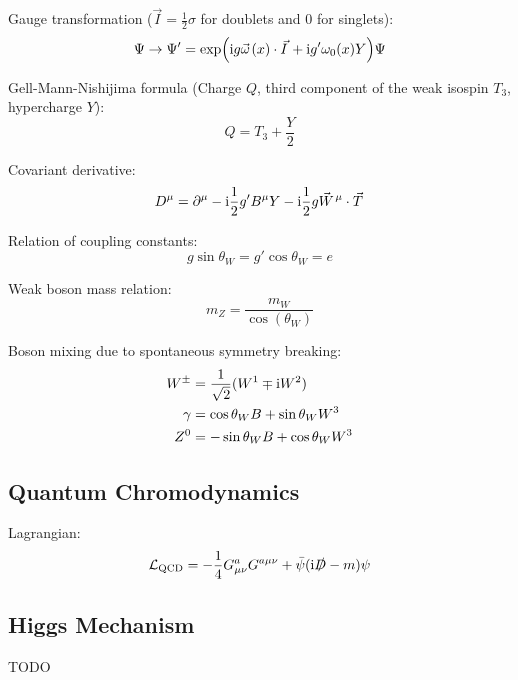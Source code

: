 		\noindent
		Gauge transformation ($\vec{I}=\frac{1}{2}\sigma$ for doublets and $0$ for singlets):
		\begin{equation}
			\Psi \rightarrow \Psi' = \exp(\i g \vec{\omega}(x)\cdot\vec{I}	+ \i g' \omega_0(x) Y) \Psi
		\end{equation}

		\noindent
		Gell-Mann-Nishijima formula (Charge $Q$, third component of the weak isospin $T_3$, hypercharge $Y$):
		\begin{equation}
			Q = T_3 + \frac{Y}{2}
		\end{equation}

		\noindent
		Covariant derivative:
		\begin{equation}
			D^\mu = \partial^\mu - \i \frac{1}{2} g' B^\mu Y - \i \frac{1}{2} g \vec{W}^\mu \cdot \vec{T}
		\end{equation}
		
		\noindent
		Relation of coupling constants:
		\begin{equation}
			g \sin\theta_W = g' \cos\theta_W = e
		\end{equation}

		\noindent
		Weak boson mass relation:
		\begin{equation}
			m_Z = \frac{m_W}{\cos(\theta_W)}
		\end{equation}
		
		\noindent
		Boson mixing due to spontaneous symmetry breaking:
		\begin{equation}
			\begin{aligned}
				W^\pm &= \frac{1}{\sqrt{2}}(W^1 \mp \mathrm{i} W^2) \\
				\gamma &= \cos\theta_W B + \sin\theta_W W^3 \\
				Z^0 &= -\sin\theta_W B + \cos\theta_W W^3
			\end{aligned}
		\end{equation}


	\subsection{Quantum Chromodynamics} 
		Lagrangian:
		\begin{equation}
			\mathcal{L}_\text{QCD} = -\frac{1}{4} G^a_{\mu\nu} G^{a\mu\nu} + \bar{\psi}(\mathrm{i}\slashed{D}-m)\psi
		\end{equation}
		


	\subsection{Higgs Mechanism} TODO

